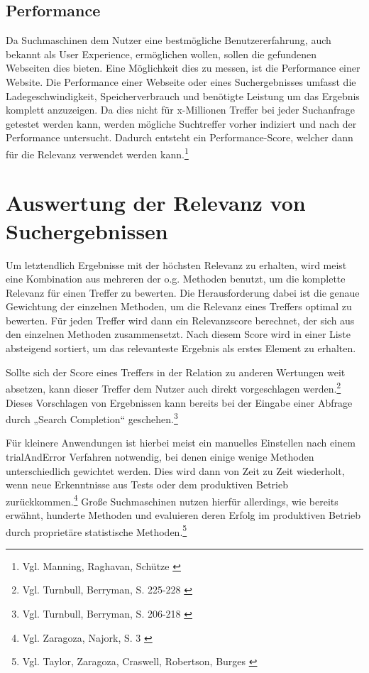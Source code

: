 \subsection{Performance}
\label{sub:relevancePerformance}
Da Suchmaschinen dem Nutzer eine bestmögliche Benutzererfahrung, auch bekannt als User Experience, ermöglichen wollen, sollen die gefundenen Webseiten dies bieten. Eine Möglichkeit dies zu messen, ist die Performance einer Website.
Die Performance einer Webseite oder eines Suchergebnisses umfasst die Ladegeschwindigkeit, Speicherverbrauch und benötigte Leistung um das Ergebnis komplett anzuzeigen.
Da dies nicht für x-Millionen Treffer bei jeder Suchanfrage getestet werden kann, werden mögliche Suchtreffer vorher indiziert und nach der Performance untersucht.
Dadurch entsteht ein Performance-Score, welcher dann für die Relevanz verwendet werden kann.\footnote{Vgl. Manning, Raghavan, Schütze \cite{manning2008}}

\section{Auswertung der Relevanz von Suchergebnissen}
\label{sec:relevanceScore}
Um letztendlich Ergebnisse mit der höchsten Relevanz zu erhalten, wird meist eine Kombination aus mehreren der o.g. Methoden benutzt, um die komplette Relevanz für einen Treffer zu bewerten.
Die Herausforderung dabei ist die genaue Gewichtung der einzelnen Methoden, um die Relevanz eines Treffers optimal zu bewerten.
Für jeden Treffer wird dann ein Relevanzscore berechnet, der sich aus den einzelnen Methoden zusammensetzt. Nach diesem Score wird in einer Liste absteigend sortiert, um das relevanteste Ergebnis als erstes Element zu erhalten.

Sollte sich der Score eines Treffers in der Relation zu anderen Wertungen weit absetzen, kann dieser Treffer dem Nutzer auch direkt vorgeschlagen werden.\footnote{Vgl. Turnbull, Berryman, S. 225-228 \cite{turnbull2016}}
 Dieses Vorschlagen von Ergebnissen kann bereits bei der Eingabe einer Abfrage durch „Search Completion“ geschehen.\footnote{Vgl. Turnbull, Berryman, S. 206-218 \cite{turnbull2016}}

Für kleinere Anwendungen ist hierbei meist ein manuelles Einstellen nach einem \gls{trialAndError} Verfahren notwendig, bei denen einige wenige Methoden unterschiedlich gewichtet werden.
Dies wird dann von Zeit zu Zeit wiederholt, wenn neue Erkenntnisse aus Tests oder dem produktiven Betrieb zurückkommen.\footnote{Vgl. Zaragoza, Najork, S. 3 \cite{zaragoza2018}}
Große Suchmaschinen nutzen hierfür allerdings, wie bereits erwähnt, hunderte Methoden und evaluieren deren Erfolg im produktiven Betrieb durch proprietäre statistische Methoden.\footnote{Vgl. Taylor, Zaragoza, Craswell, Robertson, Burges \cite{taylor2006}}

